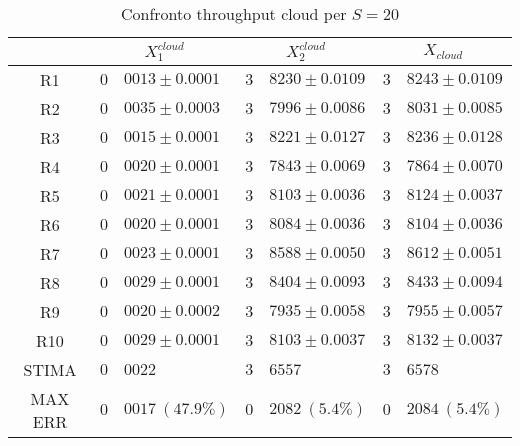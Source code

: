 \begin{table}[!h]
\begin{tabular}{c|r@{.}l|r@{.}l|r@{.}l}
& \multicolumn{2}{|c|}{$X_1^{cloud}$}
& \multicolumn{2}{|c|}{$X_2^{cloud}$}
& \multicolumn{2}{|c}{$X_{cloud}$} 
\\          
\hline
R1      & $0$&$0013 \pm 0.0001$ & $3$&$8230 \pm 0.0109$ & $3$&$8243 \pm 0.0109$ \\
R2      & $0$&$0035 \pm 0.0003$ & $3$&$7996 \pm 0.0086$ & $3$&$8031 \pm 0.0085$ \\
R3      & $0$&$0015 \pm 0.0001$ & $3$&$8221 \pm 0.0127$ & $3$&$8236 \pm 0.0128$ \\
R4      & $0$&$0020 \pm 0.0001$ & $3$&$7843 \pm 0.0069$ & $3$&$7864 \pm 0.0070$ \\
R5      & $0$&$0021 \pm 0.0001$ & $3$&$8103 \pm 0.0036$ & $3$&$8124 \pm 0.0037$ \\
R6      & $0$&$0020 \pm 0.0001$ & $3$&$8084 \pm 0.0036$ & $3$&$8104 \pm 0.0036$ \\
R7      & $0$&$0023 \pm 0.0001$ & $3$&$8588 \pm 0.0050$ & $3$&$8612 \pm 0.0051$ \\
R8      & $0$&$0029 \pm 0.0001$ & $3$&$8404 \pm 0.0093$ & $3$&$8433 \pm 0.0094$ \\
R9      & $0$&$0020 \pm 0.0002$ & $3$&$7935 \pm 0.0058$ & $3$&$7955 \pm 0.0057$ \\
R10     & $0$&$0029 \pm 0.0001$ & $3$&$8103 \pm 0.0037$ & $3$&$8132 \pm 0.0037$ \\
STIMA   & $0$&$0022$            & $3$&$6557$            & $3$&$6578$            \\
MAX ERR & $0$&$0017 \ (47.9\%)$ & $0$&$2082 \ (5.4\%)$  & $0$&$2084 \ (5.4\%)$    
\end{tabular}
\centering
\caption{Confronto throughput cloud per $S=20$}
\label{tab:20_xcloud}
\end{table}
